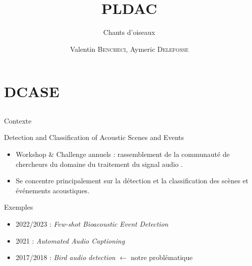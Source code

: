 \documentclass[compress,xcolor=table]{beamer}
\title{PLDAC}
\subtitle{Chants d'oiseaux} %
\date{\formatdate{25}{05}{2023}}
\author{Valentin \textsc{Bencheci}, Aymeric \textsc{Delefosse}}
\institute{Master DAC - Sorbonne Université} %
\begin{document}
\begin{frame}[plain]
    \titlepage
    \setcounter{framenumber}{0}
\end{frame}


\section{DCASE} \subsection{}

\begin{frame}{Contexte}

    \begin{block}{Detection and Classification of Acoustic Scenes and Events}

        \begin{itemize}
            \item
                  Workshop \& Challenge annuels : rassemblement de la communauté de chercheurs du domaine du traitement du signal audio .
            \item
                  Se concentre principalement sur la détection et la classification des scènes et événements acoustiques.
        \end{itemize}

    \end{block}

    \begin{exampleblock}{Exemples}
        \begin{itemize}
            \item
                  2022/2023 : \textit{Few-shot Bioacoustic Event Detection}
            \item
                  2021 : \textit{Automated Audio Captioning}
            \item
                  2017/2018 : \textit{Bird audio detection} $\leftarrow$ notre problématique
        \end{itemize}
    \end{exampleblock}

\end{frame}



\end{document}
